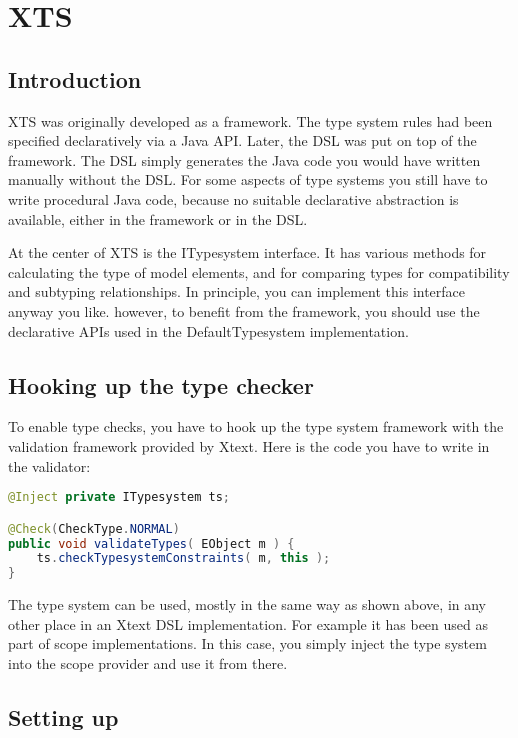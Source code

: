 \section{XTS}
\label{sec:xts}

\subsection{Introduction}

XTS was originally developed as a framework. The type system rules  had been
specified declaratively via a Java API. Later, the DSL was put on top of the
framework. The DSL simply generates the Java code you would have written
manually without the DSL. For some aspects of type systems you still have to
write procedural Java code, because no suitable declarative abstraction is
available, either in the framework or in the DSL.

At the center of XTS is the ITypesystem interface. It has various methods for
calculating the type of model elements, and for comparing types for
compatibility and subtyping relationships. In principle, you can implement this
interface anyway you like. however, to benefit from the framework, you should
use the declarative APIs used in the DefaultTypesystem implementation.

\subsection{Hooking up the type checker}

To enable type checks, you have to hook up the type system framework  with the
validation  framework provided by Xtext. Here is the code you have to write in
the validator:

\begin{lstlisting}[language=Java] 
@Inject private ITypesystem ts;

@Check(CheckType.NORMAL)
public void validateTypes( EObject m ) {
    ts.checkTypesystemConstraints( m, this );
}    
\end{lstlisting}

The type system can be used, mostly in the same way as shown above, in any other
place in an Xtext DSL implementation.
For example it has been used as part of scope implementations. In this case, you
simply inject the type system into the scope provider and use it from there.

\subsection{Setting up}

